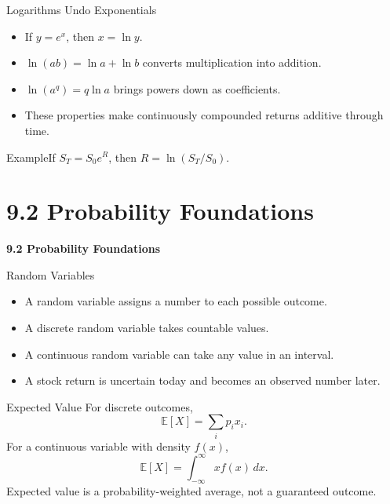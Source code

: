 \documentclass[aspectratio=169]{beamer}
\newcommand{\E}{\mathbb{E}}
\begin{document}
\begin{frame}[t]{Logarithms Undo Exponentials}
\justifying
\begin{itemize}
\item If $y=e^x$, then $x=\ln y$.
\item $\ln(ab)=\ln a+\ln b$ converts multiplication into addition.
\item $\ln(a^q)=q\ln a$ brings powers down as coefficients.
\item These properties make continuously compounded returns additive through time.
\end{itemize}\begin{block}{Example}If $S_T=S_0e^R$, then $R=\ln(S_T/S_0)$.\end{block}
\end{frame}

\section{9.2 Probability Foundations}
\begin{frame}[plain]
\centering\vfill
{\color{TitleBlue}\Large\bfseries 9.2 Probability Foundations}\par
\vspace{0.5cm}{\large The minimum probability language needed for stochastic calculus}\par
\vfill\end{frame}

\begin{frame}[t]{Random Variables}
\justifying
\begin{itemize}
\item A random variable assigns a number to each possible outcome.
\item A discrete random variable takes countable values.
\item A continuous random variable can take any value in an interval.
\item A stock return is uncertain today and becomes an observed number later.
\end{itemize}
\end{frame}

\begin{frame}[t]{Expected Value}
\justifying
For discrete outcomes,
\[\E[X]=\sum_i p_i x_i.\]
For a continuous variable with density $f(x)$,
\[\E[X]=\int_{-\infty}^{\infty}x f(x)\,dx.\]
Expected value is a probability-weighted average, not a guaranteed outcome.
\end{frame}
\end{document}
